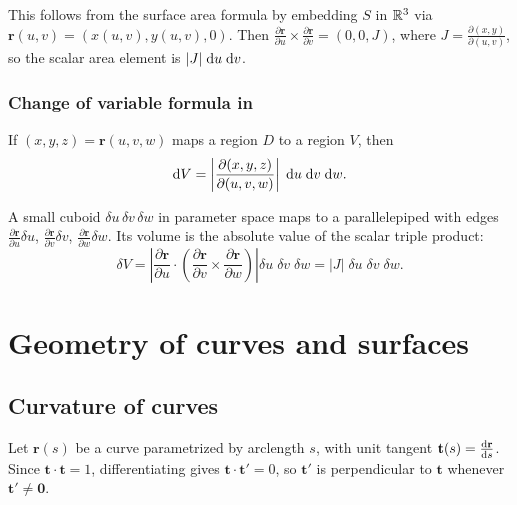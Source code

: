 \documentclass[a4paper]{article}
\begin{document}
\begin{rmk}
  This follows from the surface area formula by embedding $S$ in $\mathbb{R}^3$ via $\mathbf{r}(u, v) = (x(u, v), y(u, v), 0)$. Then $\frac{\partial \mathbf{r}}{\partial u}\times \frac{\partial\mathbf{r}}{\partial v} = (0, 0, J)$, where $J = \frac{\partial(x, y)}{\partial(u, v)}$, so the scalar area element is $|J|\;\mathrm{d} u\;\mathrm{d} v$.
\end{rmk}

\subsubsection*{Change of variable formula in }

\begin{prop}
  If $(x, y, z) = \mathbf{r}(u, v, w)$ maps a region $D$ to a region $V$, then
  \[
    \mathrm{d} V = \left|\frac{\partial(x, y, z)}{\partial(u, v, w)}\right|\; \mathrm{d} u\; \mathrm{d} v\; \mathrm{d} w.
  \]
\end{prop}

\begin{rmk}
  A small cuboid $\delta u\, \delta v\, \delta w$ in parameter space maps to a parallelepiped with edges $\frac{\partial \mathbf{r}}{\partial u}\delta u$, $\frac{\partial \mathbf{r}}{\partial v}\delta v$, $\frac{\partial \mathbf{r}}{\partial w}\delta w$. Its volume is the absolute value of the scalar triple product:
  \[
    \delta V = \left|\frac{\partial \mathbf{r}}{\partial u}\cdot \left( \frac{\partial \mathbf{r}}{\partial v} \times \frac{\partial \mathbf{r}}{\partial w}\right)\right| \delta u\; \delta v\;\delta w = |J|\;\delta u\; \delta v\;\delta w.
  \]
\end{rmk}

\section{Geometry of curves and surfaces}

\subsection{Curvature of curves}

\begin{rmk}
  Let $\mathbf{r}(s)$ be a curve parametrized by arclength $s$, with unit tangent $\mathbf{t}(s) = \frac{\mathrm{d} \mathbf{r}}{\mathrm{d} s}$. Since $\mathbf{t}\cdot \mathbf{t} = 1$, differentiating gives $\mathbf{t}\cdot \mathbf{t}' = 0$, so $\mathbf{t}'$ is perpendicular to $\mathbf{t}$ whenever $\mathbf{t}' \neq \mathbf{0}$.
\end{rmk}
\end{document}
